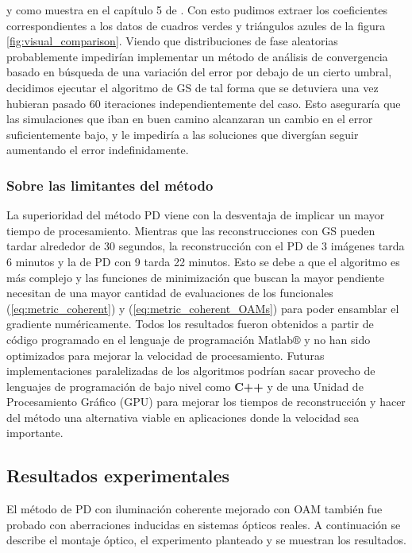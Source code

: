 y como muestra en el capítulo 5 de . Con esto
pudimos extraer los coeficientes correspondientes a los datos de
cuadros verdes y triángulos azules de la figura
\ref{fig:visual_comparison}. 
Viendo que distribuciones de fase aleatorias probablemente impedirían
implementar un método de análisis de convergencia basado en búsqueda
de una variación del error por debajo de un cierto umbral, decidimos
ejecutar el algoritmo de GS de tal forma que se detuviera una vez
hubieran pasado 60 iteraciones independientemente del caso. Esto
aseguraría que las simulaciones que iban en buen camino alcanzaran un
cambio en el error suficientemente bajo, y le impediría a las
soluciones que divergían seguir aumentando el error indefinidamente. 

\subsubsection{Sobre las limitantes del método}
La superioridad del método PD viene con la desventaja de implicar un
mayor tiempo de procesamiento. Mientras que las reconstrucciones con
GS pueden tardar alrededor de 30 segundos, la reconstrucción con el PD
de 3 imágenes tarda 6 minutos y la de PD con 9 tarda 22 minutos. Esto
se debe a que el algoritmo es más complejo y las funciones de
minimización que buscan la mayor pendiente necesitan de una mayor cantidad
de evaluaciones de los funcionales (\ref{eq:metric_coherent}) y
(\ref{eq:metric_coherent_OAMs}) para poder ensamblar el gradiente
numéricamente. Todos los resultados fueron obtenidos a partir de
código programado en el lenguaje de programación Matlab$\circledR$ y
no han sido optimizados para mejorar la velocidad de
procesamiento. Futuras implementaciones paralelizadas de los
algoritmos podrían sacar provecho de lenguajes de programación de bajo
nivel como \textbf{C++} y de una Unidad de Procesamiento Gráfico (GPU)
para mejorar los tiempos de reconstrucción y hacer del método una
alternativa viable en aplicaciones donde la velocidad sea importante. 

\subsection{Resultados experimentales}
\label{sec:ChPD_resultados_experimentales}

El método de PD con iluminación coherente mejorado con OAM también fue
probado con aberraciones inducidas en sistemas ópticos reales. A
continuación se describe el montaje óptico, el experimento planteado y
se muestran los resultados. 

